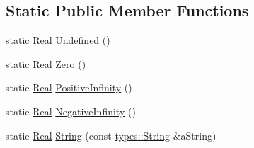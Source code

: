 \subsection*{Static Public Member Functions}
\begin{DoxyCompactItemize}
\item 
static \hyperlink{classlibrary_1_1core_1_1types_1_1_real}{Real} \hyperlink{classlibrary_1_1core_1_1types_1_1_real_a67778e3d4c5a5b6ca6ddcd47964b9a79}{Undefined} ()
\item 
static \hyperlink{classlibrary_1_1core_1_1types_1_1_real}{Real} \hyperlink{classlibrary_1_1core_1_1types_1_1_real_a35434e6329366cb571efbd9c4ead6501}{Zero} ()
\item 
static \hyperlink{classlibrary_1_1core_1_1types_1_1_real}{Real} \hyperlink{classlibrary_1_1core_1_1types_1_1_real_a7f4aa42fec951281e976eebca95e695e}{Positive\+Infinity} ()
\item 
static \hyperlink{classlibrary_1_1core_1_1types_1_1_real}{Real} \hyperlink{classlibrary_1_1core_1_1types_1_1_real_a04f125b4861a4f348b9754fc65fbbb43}{Negative\+Infinity} ()
\item 
static \hyperlink{classlibrary_1_1core_1_1types_1_1_real}{Real} \hyperlink{classlibrary_1_1core_1_1types_1_1_real_ac0209eca829dcdc3b1be96f834763d8e}{String} (const \hyperlink{classlibrary_1_1core_1_1types_1_1_string}{types\+::\+String} \&a\+String)
\end{DoxyCompactItemize}
